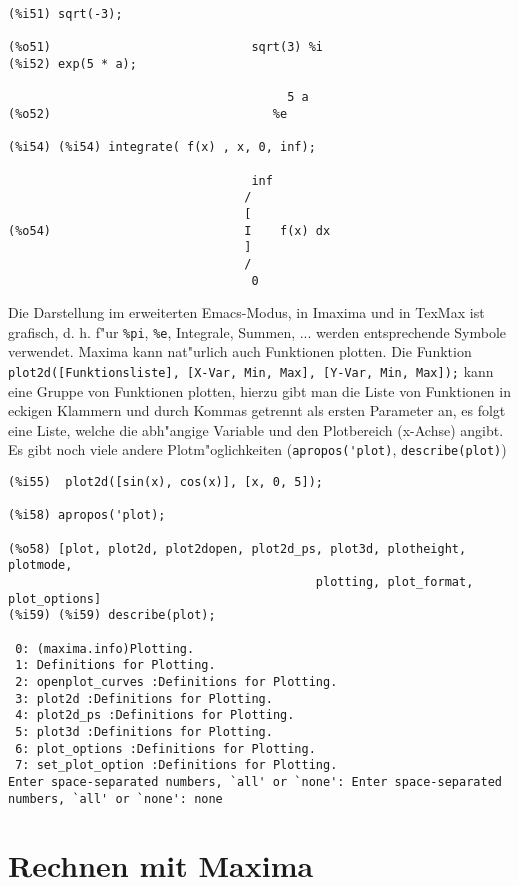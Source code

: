 \documentclass[spanish,12pt,a4paper]{article}
\begin{document}
\scriptsize
\begin{verbatim}
(%i51) sqrt(-3);

(%o51)                            sqrt(3) %i
(%i52) exp(5 * a);

                                       5 a
(%o52)                               %e

(%i54) (%i54) integrate( f(x) , x, 0, inf);

                                  inf
                                 /
                                 [
(%o54)                           I    f(x) dx
                                 ]
                                 /
                                  0
\end{verbatim}
\normalsize

Die Darstellung im erweiterten Emacs-Modus, in Imaxima und in TexMax ist grafisch, d. h. f"ur \verb|%pi|, \verb|%e|, Integrale, Summen, ... werden entsprechende Symbole verwendet.
Maxima kann nat"urlich auch Funktionen plotten. Die Funktion \verb|plot2d([Funktionsliste], [X-Var, Min, Max], [Y-Var, Min, Max]);| kann eine Gruppe von Funktionen plotten, hierzu gibt man die Liste von Funktionen in eckigen Klammern und durch Kommas getrennt als ersten Parameter an, es folgt eine Liste, welche die abh"angige Variable und den Plotbereich (x-Achse) angibt. Es gibt noch viele andere Plotm"oglichkeiten (\verb|apropos('plot)|, \verb|describe(plot)|)

\scriptsize
\begin{verbatim}
(%i55)  plot2d([sin(x), cos(x)], [x, 0, 5]);

(%i58) apropos('plot);

(%o58) [plot, plot2d, plot2dopen, plot2d_ps, plot3d, plotheight, plotmode, 
                                           plotting, plot_format, plot_options]
(%i59) (%i59) describe(plot);

 0: (maxima.info)Plotting.
 1: Definitions for Plotting.
 2: openplot_curves :Definitions for Plotting.
 3: plot2d :Definitions for Plotting.
 4: plot2d_ps :Definitions for Plotting.
 5: plot3d :Definitions for Plotting.
 6: plot_options :Definitions for Plotting.
 7: set_plot_option :Definitions for Plotting.
Enter space-separated numbers, `all' or `none': Enter space-separated numbers, `all' or `none': none
\end{verbatim}
\normalsize


\section{Rechnen mit Maxima}
\end{document}
